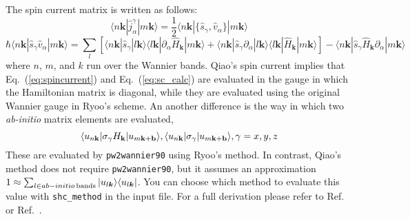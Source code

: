 The spin current matrix is written as follows:
\begin{equation}
\label{eq:spincurrent}
    \langle n\bm{k}| \hat{j}_{\alpha}^{\gamma}|m\bm{k}\rangle = \frac{1}{2}\langle n\bm{k}| \{\hat{s}_{\gamma}, \hat{v}_{\alpha} \} |m\bm{k}\rangle
\end{equation}
\begin{equation}
\label{eq:sc_calc}
    \hbar \langle n\bm{k}| \hat{s}_{\gamma}\hat{v}_{\alpha} |m\bm{k}\rangle = \sum_{l} [ \langle n\bm{k}| \hat{s}_{\gamma}|l\bm{k}\rangle \langle l\bm{k}| \partial_{\alpha}\hat{H}_{\bm{k}}|m\bm{k}\rangle + \langle n\bm{k}| \hat{s}_{\gamma}\partial_{\alpha}|l\bm{k}\rangle \langle l\bm{k}| \hat{H}_{\bm{k}}|m\bm{k}\rangle ] - \langle n\bm{k}| \hat{s}_{\gamma} \hat{H}_{\bm{k}}  \partial_{\alpha} |m\bm{k}\rangle
\end{equation}
where $n$, $m$, and $k$ run over the Wannier bands. Qiao's spin current implies that Eq.~(\ref{eq:spincurrent}) and Eq.~(\ref{eq:sc_calc}) are evaluated in the gauge in which the Hamiltonian matrix is diagonal, while they are evaluated using the original Wannier gauge in Ryoo's scheme. An another difference is the way in which two {\it ab-initio} matrix elements are evaluated,
\begin{equation}
  \langle u_{n{\bf k}}\vert\sigma_\gamma H_{\bf k}\vert u_{m{\bf k}+{\bf b}}\rangle, \langle u_{n{\bf k}}\vert\sigma_\gamma \vert u_{m{\bf k}+{\bf b}}\rangle, \gamma = x, y, z
\end{equation}
These are evaluated by {\tt pw2wannier90} using Ryoo's method. In contrast, Qiao's method does not require {\tt pw2wannier90}, but it assumes an approximation $1\approx\sum_{ l\in ab-initio{\rm \,bands}}|u_{l\bm{k}}\rangle \langle u_{l\bm{k}}|$. You can choose which method to evaluate this value with {\tt shc\_method} in the input file. For a full derivation please refer to Ref.~\cite{qiao-prb2018} or Ref.~\cite{ryoo-prb2019}.

